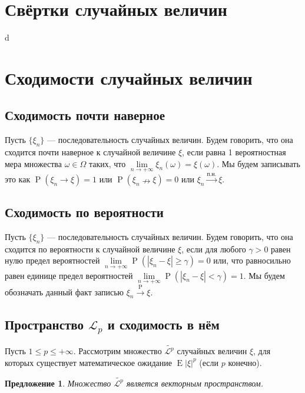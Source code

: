 \documentclass[12pt]{article}
\newtheorem{proposition}[theorem]{Предложение}
\numberwithin{theorem}{section}
\theoremstyle{definition}
\newcommand{\defin}[2]{\hypertarget{#2}{{\color{red} #1}}}
\newcommand{\prob}{\operatorname{P}}
\newcommand{\expect}{\operatorname{E}}
\begin{document}
	\section{Свёртки случайных величин}
	
	d
	
	\section{Сходимости случайных величин}
	
	\subsection{Сходимость почти наверное}
	
	Пусть $ \{\xi_n\} $ --- последовательность случайных величин.
	Будем говорить, что она \defin{сходится почти наверное}{almost surely} к случайной величине $ \xi $,
	если равна 1 вероятностная мера множества $ \omega \in \Omega $ таких, что $ \lim\limits_{n \to +\infty} \xi_n(\omega) = \xi(\omega) $. Мы будем записывать это как $ \prob(\xi_n \to \xi) = 1 $
	или $ \prob(\xi_n \nrightarrow \xi) = 0 $ или $ \xi_n \overset{\text{п.н.}}{\to} \xi $.
	
	\subsection{Сходимость по вероятности}
	
	Пусть $ \{\xi_n\} $ --- последовательность случайных величин.
	Будем говорить, что она \defin{сходится по вероятности}{in-pobability} к случайной величине $ \xi $,
	если для любого $ \gamma > 0 $ 
	равен нулю предел вероятностей $ \lim\limits_{n \to +\infty} \prob(|\xi_n - \xi| \geqslant \gamma) = 0 $
	или, что равносильно равен единице предел вероятностей
	$ \lim\limits_{n \to +\infty} \prob(|\xi_n - \xi| < \gamma) = 1 $.
	Мы будем обозначать данный факт записью $ \xi_n \overset{\prob}{\to} \xi $.
	
	\subsection{Пространство $ \mathcal{L}_p $ и сходимость в нём}
	
	Пусть $ 1 \leqslant p \leqslant +\infty $.
	Рассмотрим множество $ \tilde{\mathcal{L}^p} $ случайных величин $ \xi $, 
	для которых существует математическое ожидание $ \expect|\xi|^p $ (если $ p $ конечно).
	
	\begin{proposition}
		Множество $ \tilde{\mathcal{L}^p} $ является векторным пространством.
	\end{proposition}	
	
\end{document}
